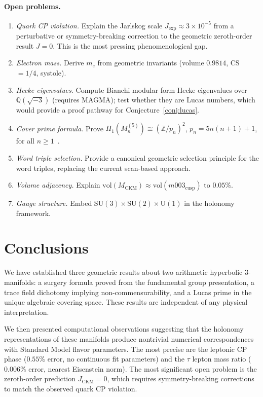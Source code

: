 \documentclass[11pt,a4paper]{article}
\theoremstyle{definition}
\theoremstyle{remark}
\newcommand{\ZZ}{\mathbb{Z}}
\newcommand{\QQ}{\mathbb{Q}}
\newcommand{\MCKM}{M_{\mathrm{CKM}}}
\begin{document}
\paragraph{Open problems.}
\begin{enumerate}[(1)]
\item \emph{Quark CP violation.}
  Explain the Jarlskog scale $J_\mathrm{exp}\approx3\times10^{-5}$
  from a perturbative or symmetry-breaking correction to the
  geometric zeroth-order result $J=0$.
  This is the most pressing phenomenological gap.
\item \emph{Electron mass.}
  Derive $m_e$ from geometric invariants
  (volume $0.9814$, CS$=1/4$, systole).
\item \emph{Hecke eigenvalues.}
  Compute Bianchi modular form Hecke eigenvalues over
  $\QQ(\sqrt{-3})$ (requires MAGMA); test whether they are
  Lucas numbers, which would provide a proof pathway for
  Conjecture~\ref{conj:lucas}.
\item \emph{Cover prime formula.}
  Prove $H_1(M_n^{(5)})\cong(\ZZ/p_n)^2$,
  $p_n=5n(n+1)+1$, for all $n\geq1$~\cite{Gentry:Farey}.
\item \emph{Word triple selection.}
  Provide a canonical geometric selection principle for the
  word triples, replacing the current scan-based approach.
\item \emph{Volume adjacency.}
  Explain $\mathrm{vol}(\MCKM)\approx\mathrm{vol}(m003_\mathrm{cusp})$
  to $0.05\%$.
\item \emph{Gauge structure.}
  Embed $\mathrm{SU}(3)\times\mathrm{SU}(2)\times\mathrm{U}(1)$
  in the holonomy framework.
\end{enumerate}

\section{Conclusions}
\label{sec:conclusions}

We have established three geometric results about two arithmetic
hyperbolic 3-manifolds: a surgery formula proved from the
fundamental group presentation, a trace field dichotomy implying
non-commensurability, and a Lucas prime in the unique algebraic
covering space.
These results are independent of any physical interpretation.

We then presented computational observations suggesting that
the holonomy representations of these manifolds produce
nontrivial numerical correspondences with Standard Model flavor
parameters.
The most precise are the leptonic CP phase ($0.55\%$ error,
no continuous fit parameters) and the $\tau$ lepton mass ratio
($0.006\%$ error, nearest Eisenstein norm).
The most significant open problem is the zeroth-order prediction
$J_\mathrm{CKM}=0$, which requires symmetry-breaking corrections
to match the observed quark CP violation.
\end{document}
